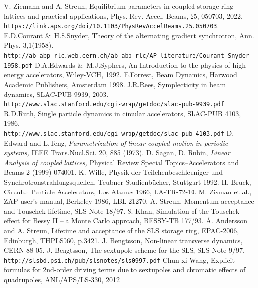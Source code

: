 \documentclass[12pt]{article}
\newcommand{\biburl}[1]{{\small{\tt #1}}}
\begin{document}
\begin{thebibliography}{18}
V. Ziemann and A. Streun, Equilibrium parameters in coupled storage ring lattices and practical applications, Phys. Rev. Accel. Beams, 25, 050703, 2022. \biburl{https://link.aps.org/doi/10.1103/PhysRevAccelBeams.25.050703}.
E.D.Courant \&\ H.S.Snyder, Theory of the alternating gradient synchrotron, Ann. Phys. 3,1(1958).\\
 \biburl{http://ab-abp-rlc.web.cern.ch/ab-abp-rlc/AP-literature/Courant-Snyder-1958.pdf}
D.A.Edwards \&\ M.J.Syphers, An Introduction to the physics of high energy accelerators, Wiley-VCH, 1992.
E.Forrest, Beam Dynamics, Harwood Academic Publishers, Amsterdam 1998.
J.R.Rees, Symplecticity in beam dynamics, SLAC-PUB 9939, 2003.\\
 \biburl{http://www.slac.stanford.edu/cgi-wrap/getdoc/slac-pub-9939.pdf}
R.D.Ruth, Single particle dynamics in circular accelerators, SLAC-PUB 4103, 1986.\\
 \biburl{http://www.slac.stanford.edu/cgi-wrap/getdoc/slac-pub-4103.pdf}
 D. Edward and L.Teng, {\em Parametrization of linear coupled motion in periodic
systems,} IEEE Trans.Nucl.Sci. 20, 885 (1973).
D. Sagan, D. Rubin, {\em Linear Analysis of coupled lattices,} Physical Review Special
Topics--Accelerators and Beams 2 (1999) 074001.
K. Wille, Physik der Teilchenbeschleuniger und Synchrotronstrahlungsquellen, Teubner Studienb\"{u}cher, Stuttgart 1992.
H. Bruck, Circular Particle Accelerators, Los Alamos 1966, LA-TR-72-10.
M. Zisman et al., ZAP user's manual, Berkeley 1986, LBL-21270.
A. Streun, Momentum acceptance and Touschek lifetime, SLS-Note 18/97.
S. Khan, Simulation of the Touschek effect for Bessy II -- a Monte
Carlo approach, BESSY-TB 177/93.
\AA. Andersson and A. Streun, Lifetime and acceptance of the SLS storage ring, EPAC-2006, Edinburgh, THPLS060, p.3421.
J. Bengtsson, Non-linear transverse dynamics, CERN-88-05.
J. Bengtsson, The sextupole scheme for the SLS, SLS-Note 9/97,  \biburl{http://slsbd.psi.ch/pub/slsnotes/sls0997.pdf}
Chun-xi Wang, Explicit formulas for 2nd-order driving terms due to sextupoles and chromatic effects of quadrupoles, ANL/APS/LS-330, 2012%

\end{thebibliography}
\end{document}

